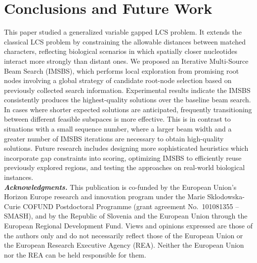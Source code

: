 \documentclass[runningheads]{llncs}
\begin{document}

\section{Conclusions and Future Work}
\label{sec: conclusions}

This paper studied a generalized variable gapped LCS problem. It extends the classical LCS problem by constraining the allowable distances between matched characters, reflecting biological scenarios in which spatially closer nucleotides interact more strongly than distant ones.  
We proposed an Iterative Multi-Source Beam Search (IMSBS), which performs local exploration from promising root nodes involving a global strategy of candidate root-node selection based on previously collected search information. Experimental results indicate the IMSBS consistently produces the highest-quality solutions over the baseline beam search. In cases where shorter expected solutions are anticipated, frequently transitioning between different feasible subspaces is more effective. This is in contrast to situations with a small sequence number, where a larger beam width and a greater number of IMSBS iterations are necessary to obtain high-quality solutions.  %
 Future research includes designing more sophisticated heuristics which incorporate gap constraints into scoring, optimizing IMSBS to efficiently reuse previously explored regions, %
 and testing the approaches on real-world biological instances. %
 \\

 \textit{\textbf{Acknowledgments.}}  \footnotesize{This publication is co-funded by the European Union’s Horizon Europe research and innovation program under the Marie Sklodowska-Curie COFUND Postdoctoral Programme (grant agreement No.~101081355 -- SMASH), and by the Republic of Slovenia and the European Union through the European Regional Development Fund. Views and opinions expressed are those of the authors only and do not necessarily reflect those of the European Union or the European Research Executive Agency (REA). Neither the European Union nor the REA can be held responsible for them.}

	
	
 
\end{document}
